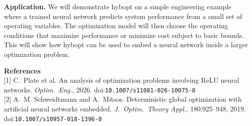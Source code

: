 \documentclass[11pt]{article}
\begin{document}
\textbf{Application.} We will demonstrate hybopt on a simple engineering example where a trained neural network predicts system performance from a small set of operating variables. The optimization model will then choose the operating conditions that maximize performance or minimize cost subject to basic bounds. This will show how hybopt can be used to embed a neural network inside a larger optimization problem.

\vspace{2pt}
{\small
\textbf{References}\\
{[1]} C.~Plate et al. An analysis of optimization problems involving ReLU neural networks. \emph{Optim.\ Eng.}, 2026. doi:\nolinkurl{10.1007/s11081-026-10075-8}\\
{[2]} A.~M. Schweidtmann and A.~Mitsos. Deterministic global optimization with artificial neural networks embedded. \emph{J.\ Optim.\ Theory Appl.}, 180:925--948, 2019. doi:\nolinkurl{10.1007/s10957-018-1396-0}
}
\end{document}
